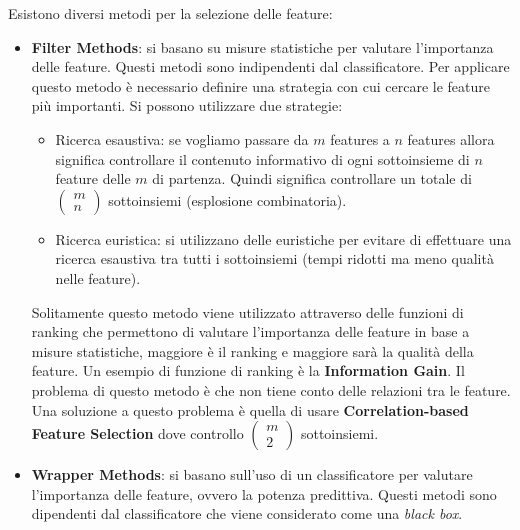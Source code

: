 Esistono diversi metodi per la selezione delle feature:
\begin{itemize}
      \item \textbf{Filter Methods}: si basano su misure statistiche per valutare
            l'importanza delle feature. Questi metodi sono indipendenti dal
            classificatore. Per applicare questo metodo è necessario definire
            una strategia con cui cercare le feature più importanti. Si possono
            utilizzare due strategie:
            \begin{itemize}
                  \item Ricerca esaustiva: se vogliamo passare da $m$ features a
                        $n$ features allora significa controllare il contenuto informativo
                        di ogni sottoinsieme di $n$ feature delle $m$ di partenza. Quindi
                        significa controllare un totale di $\left(\begin{array}{c}
                                    m \\n
                              \end{array}\right) $ sottoinsiemi (esplosione combinatoria).
                  \item Ricerca euristica: si utilizzano delle euristiche per
                        evitare di effettuare una ricerca esaustiva tra tutti i
                        sottoinsiemi (tempi ridotti ma meno qualità nelle feature).
            \end{itemize}
            Solitamente questo metodo viene utilizzato attraverso delle funzioni
            di ranking che permettono di valutare l'importanza delle feature in
            base a misure statistiche, maggiore è il ranking e maggiore sarà
            la qualità della feature. Un esempio di funzione di ranking è la
            \textbf{Information Gain}.
            Il problema di questo metodo è che non tiene conto delle relazioni tra
            le feature. Una soluzione a questo problema è quella di usare
            \textbf{Correlation-based Feature Selection} dove controllo $\left(\begin{array}{c}
                              m \\2
                        \end{array}\right) $ sottoinsiemi.
      \item \textbf{Wrapper Methods}: si basano sull'uso di un classificatore per
            valutare l'importanza delle feature, ovvero la potenza predittiva.
            Questi metodi sono dipendenti dal
            classificatore che viene considerato come una \textit{black box}.


\end{itemize}
